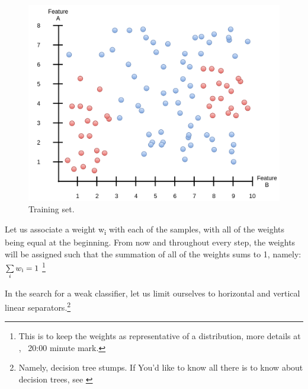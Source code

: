 \documentclass[a4paper, 12pt]{article}
\begin{document}
                    \begin{figure}[h]
                            \caption{Training set.}
                            \centering
                            \includegraphics[width=\textwidth]{boosting0}
                    \end{figure} 
                    
                    \par Let us associate a weight w\textsubscript{i} with each of the samples, with all of the weights being equal at the beginning. From now and throughout every step, the weights will be assigned such that the summation of all of the weights sums to 1, namely: {\Large \(\sum\limits_{i}w\textsubscript{i} = 1\) }\footnote{This is to keep the weights as representative of a distribution, more details at \cite{boosting}, ~20:00 minute mark.}
                    

                    
                    \par In the search for a weak classifier, let us limit ourselves to horizontal and vertical linear separators.\footnote{Namely, decision tree stumps. If You'd like to know all there is to know about decision trees, see \cite{decisionTrees}}
                   
\end{document}
